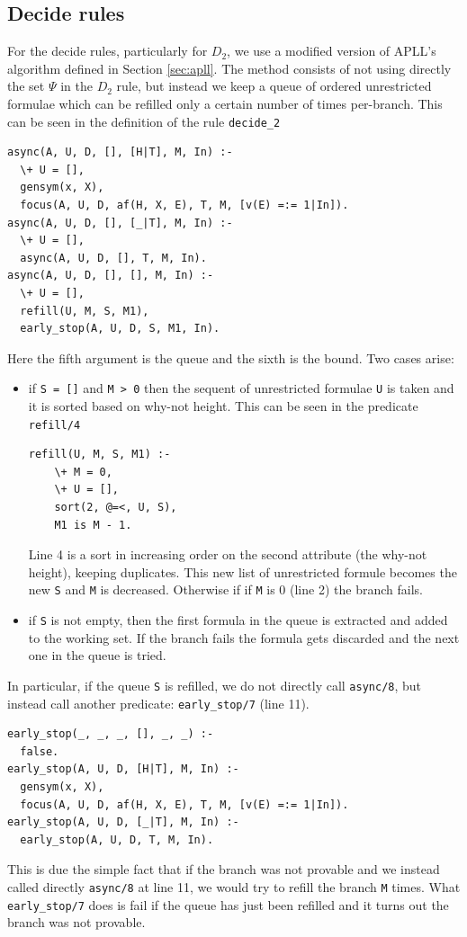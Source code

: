 \documentclass[a4paper, 12pt, english]{report}
\begin{document}
\subsection{Decide rules}\label{sec:decide}
For the decide rules, particularly for $D_2$, we use a modified version of APLL's algorithm defined in Section \ref{sec:apll}.
The method consists of not using directly the set $\Psi$ in the $D_2$ rule, but instead we keep a queue of ordered unrestricted formulae which can be refilled only a certain number of times per-branch.
This can be seen in the definition of the rule \texttt{decide\_2}
\begin{verbatim}
async(A, U, D, [], [H|T], M, In) :-
  \+ U = [],
  gensym(x, X),
  focus(A, U, D, af(H, X, E), T, M, [v(E) =:= 1|In]).
async(A, U, D, [], [_|T], M, In) :-
  \+ U = [],
  async(A, U, D, [], T, M, In).
async(A, U, D, [], [], M, In) :-
  \+ U = [],
  refill(U, M, S, M1),
  early_stop(A, U, D, S, M1, In).
\end{verbatim}
Here the fifth argument is the queue and the sixth is the bound.
Two cases arise:
\begin{itemize}
	\item if \texttt{S = []} and \texttt{M > 0} then the sequent of unrestricted formulae \texttt{U} is taken and it is sorted based on why-not height.	%
		This can be seen in the predicate \texttt{refill/4}
		\begin{verbatim}
refill(U, M, S, M1) :-
	\+ M = 0,
	\+ U = [], 
	sort(2, @=<, U, S), 
	M1 is M - 1.
		\end{verbatim}
		Line 4 is a sort in increasing order on the second attribute (the why-not height), keeping duplicates.
		This new list of unrestricted formule becomes the new \texttt{S} and \texttt{M} is decreased.
		Otherwise if if \texttt{M} is 0 (line 2) the branch fails.
	\item if \texttt{S} is not empty, then the first formula in the queue is extracted and added to the working set.	%
		If the branch fails the formula gets discarded and the next one in the queue is tried.	%
\end{itemize}
In particular, if the queue \texttt{S} is refilled, we do not directly call \texttt{async/8}, but instead call another predicate: \texttt{early\_stop/7} (line 11).
\begin{verbatim}
early_stop(_, _, _, [], _, _) :-
  false.
early_stop(A, U, D, [H|T], M, In) :-
  gensym(x, X),
  focus(A, U, D, af(H, X, E), T, M, [v(E) =:= 1|In]).
early_stop(A, U, D, [_|T], M, In) :-
  early_stop(A, U, D, T, M, In).
\end{verbatim}
This is due the simple fact that if the branch was not provable and we instead called directly \texttt{async/8} at line 11, we would try to refill the branch \texttt{M} times.
What \texttt{early\_stop/7} does is fail if the queue has just been refilled and it turns out the branch was not provable.
\end{document}
